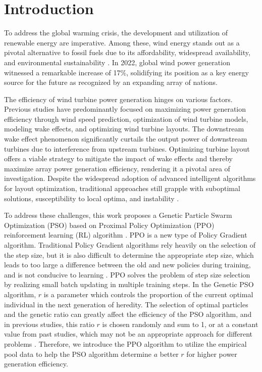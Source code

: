 \documentclass[review]{elsarticle}
\begin{document}
\section{Introduction}
To address the global warming crisis, the development and utilization of renewable energy are imperative. Among these, wind energy stands out as a pivotal alternative to fossil fuels due to its affordability, widespread availability, and environmental sustainability \cite{cheng2014state, mohammadi2013using, kadri2020energy}. In 2022, global wind power generation witnessed a remarkable increase of 17$\%$, solidifying its position as a key energy source for the future as recognized by an expanding array of nations.

The efficiency of wind turbine power generation hinges on various factors. Previous studies have predominantly focused on maximizing power generation efficiency through wind speed prediction, optimization of wind turbine models, modeling wake effects, and optimizing wind turbine layouts. The downstream wake effect phenomenon significantly curtails the output power of downstream turbines due to interference from upstream turbines. Optimizing turbine layout offers a viable strategy to mitigate the impact of wake effects and thereby maximize array power generation efficiency, rendering it a pivotal area of investigation. Despite the widespread adoption of advanced intelligent algorithms for layout optimization, traditional approaches still grapple with suboptimal solutions, susceptibility to local optima, and instability \cite{zhang2020dynamic, zhang2021soft, zhao2020review, jang2022techno}.

To address these challenges, this work proposes a Genetic Particle Swarm Optimization (PSO) based on Proximal Policy Optimization (PPO) reinforcement learning (RL) algorithm \cite{cai2020provably, kuznetsova2013reinforcement}. PPO is a new type of Policy Gradient algorithm. Traditional Policy Gradient algorithms rely heavily on the selection of the step size, but it is also difficult to determine the appropriate step size, which leads to too large a difference between the old and new policies during training, and is not conducive to learning \cite{gu2021proximal}. PPO solves the problem of step size selection by realizing small batch updating in multiple training steps. In the Genetic PSO algorithm, $r$ is a parameter which controls the proportion of the current optimal individual in the next generation of heredity. The selection of optimal particles and the genetic ratio can greatly affect the efficiency of the PSO algorithm, and in previous studies, this ratio $r$ is chosen randomly and sum to 1, or at a constant value from past studies, which may not be an appropriate approach for different problems \cite{zhang2022proximal}. Therefore, we introduce the PPO algorithm to utilize the empirical pool data to help the PSO algorithm determine $a$ better $r$ for higher power generation efficiency.
\end{document}
